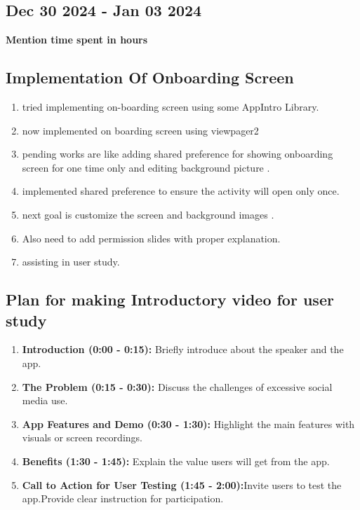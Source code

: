 \documentclass[12pt]{article}
\begin{document}
\begin{itemize}
     \section{Dec 30 2024 -  Jan 03 2024}
     {\bf Mention time spent in hours}
    \subsection{Implementation Of Onboarding Screen}
    \begin{enumerate}
    
        \item tried implementing on-boarding screen using some AppIntro Library.
        \item now implemented on boarding screen using viewpager2
        \item pending works are like adding shared preference for showing onboarding screen for one time only and editing background picture .
        \item implemented shared preference to ensure the activity will open only once.
        \item next goal is customize the screen and background images .
        \item Also need to add permission slides with proper explanation.
        \item assisting in user study.
    \end{enumerate}
    \subsection{Plan for making Introductory video for user study}
    \begin{enumerate}
        
    \item \textbf{Introduction (0:00 - 0:15):} Briefly introduce about the speaker and the app.
    \item \textbf{The Problem (0:15 - 0:30):} Discuss the challenges of excessive social media use.
    \item \textbf{ App Features and Demo (0:30 - 1:30):} Highlight the main features with visuals or screen recordings.
    \item \textbf{Benefits (1:30 - 1:45):} Explain the value users will get from the app.
    \item \textbf{Call to Action for User Testing (1:45 - 2:00):}Invite users to test the app.Provide clear instruction for participation.
    \end{enumerate}
    \end{itemize}
    
\end{document}
